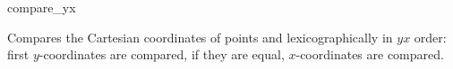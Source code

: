 \begin{ccRefFunction}{compare_yx}

      {Compares the Cartesian coordinates of points  and
        lexicographically in $yx$ order: first 
       $y$-coordinates are compared, if they are equal, $x$-coordinates
       are compared.}

\ccSeeAlso

 \\
 \\
 \\
 \\
 \\
 \\
 \\

\end{ccRefFunction}

